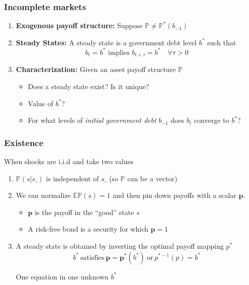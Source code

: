 \documentclass{beamer}
\begin{document}
%
\begin{frame}
	\frametitle{Incomplete markets }
	\begin{enumerate}
		\item  \textbf{Exogenous payoff structure:} Suppose $\mathbb{P}\neq \mathbb{P}^*(b_{-1})$
		
		\item \textbf{Steady States: } A steady state is a government debt level  $b^*$ such that
		\[b_{t}=b^* \text{ implies } b_{t+\tau}=b^*\quad \forall \tau >0\]
	
			
		\item \textbf{Characterization: } Given an asset payoff structure $\mathbb{P}$
		\begin{itemize}
			\item Does a steady state exist? Is it unique?
			\item Value of $b^*$?
			\item For what levels of  \emph{initial government debt} $b_{-1}$ does  $b_t$ converge to $b^*$?
 			\end{itemize}
	\end{enumerate}
\end{frame}



 \begin{frame}
  \frametitle{Existence}


 When shocks are i.i.d and take two values

  \begin{enumerate}

\item $\mathbb{P}(s|s\_)$ is independent of $s\_$ (so $\mathbb{P}$ can be a vector)
\item We can normalize $\mathbb{E}\mathbb{P}(s)=1$ and  then pin down payoffs with a scalar $\bm{p}$.
\begin{itemize}
 \item $\bm{p}$ is the payoff in the ``good'' state $s$
 \item A risk-free bond is a security for which $\bm{p}=1$
\end{itemize}

\item A steady state is obtained by inverting the optimal payoff mapping $p^*$
\begin{equation}
\label{eq-ss}
b^* \ \textrm{satisfies} \  \bm{p}=\bm{p}^*(b^*) \ \textrm{or} \ p^{* -1}(p) = b^*
\end{equation}

One equation in one unknown $b^*$
\end{enumerate}
\end{frame}
\end{document}

